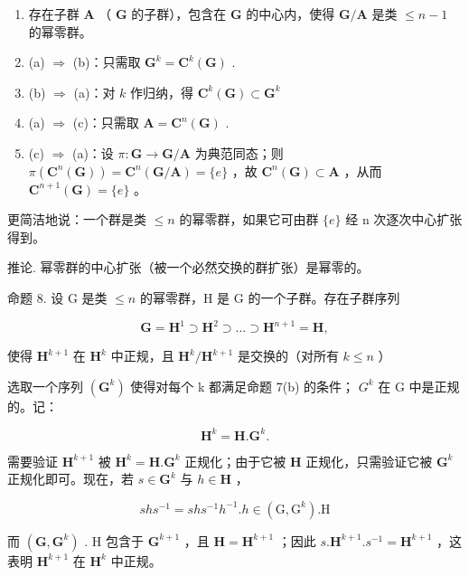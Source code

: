 \begin{enumerate}
\def\labelenumi{(\alph{enumi})}
\setcounter{enumi}{2}
\item
  存在子群 \(\mathbf{A}\) （ \(\mathbf{G}\) 的子群），包含在 \(\mathbf{G}\) 的中心内，使得 \(\mathbf{G} / \mathbf{A}\) 是类 \(\leqslant n - 1\) 的幂零群。
\item
  (a) \(\Rightarrow\) (b)：只需取 \(\mathbf{G}^k = \mathbf{C}^k (\mathbf{G})\) .
\item
  (b) \(\Rightarrow\) (a)：对 \(k\) 作归纳，得 \(\mathbf{C}^k (\mathbf{G})\subset \mathbf{G}^k\)
\item
  (a) \(\Rightarrow\) (c)：只需取 \(\mathbf{A} = \mathbf{C}^n (\mathbf{G})\) .
\item
  (c) \(\Rightarrow\) (a)：设 \(\pi: \mathbf{G} \to \mathbf{G} / \mathbf{A}\) 为典范同态；则 \(\pi(\mathbf{C}^n(\mathbf{G})) = \mathbf{C}^n(\mathbf{G} / \mathbf{A}) = \{e\}\) ，故 \(\mathbf{C}^n(\mathbf{G}) \subset \mathbf{A}\) ，从而 \(\mathbf{C}^{n+1}(\mathbf{G}) = \{e\}\) 。
\end{enumerate}

更简洁地说：一个群是类 \(\leqslant n\) 的幂零群，如果它可由群 \(\{e\}\) 经 n 次逐次中心扩张得到。

推论. 幂零群的中心扩张（被一个必然交换的群扩张）是幂零的。

命题 8. 设 G 是类 \(\leqslant n\) 的幂零群，H 是 G 的一个子群。存在子群序列

\[
\mathbf {G} = \mathbf {H} ^ {1} \supset \mathbf {H} ^ {2} \supset \dots \supset \mathbf {H} ^ {n + 1} = \mathbf {H},
\]

使得 \(\mathbf{H}^{k + 1}\) 在 \(\mathbf{H}^k\) 中正规，且 \(\mathbf{H}^k /\mathbf{H}^{k + 1}\) 是交换的（对所有 \(k\leqslant n\) ）

选取一个序列 \((\mathbf{G}^{k})\) 使得对每个 k 都满足命题 7(b) 的条件； \(G^{k}\) 在 G 中是正规的。记：

\[
\mathbf {H} ^ {k} = \mathbf {H}. \mathbf {G} ^ {k}.
\]

需要验证 \(\mathbf{H}^{k + 1}\) 被 \(\mathbf{H}^k = \mathbf{H}.\mathbf{G}^k\) 正规化；由于它被 \(\mathbf{H}\) 正规化，只需验证它被 \(\mathbf{G}^k\) 正规化即可。现在，若 \(s\in \mathbf{G}^k\) 与 \(h\in \mathbf{H}\) ，

\[
s h s ^ {- 1} = s h s ^ {- 1} h ^ {- 1}. h \in (\mathrm{G}, \mathrm{G} ^ {k}). \mathrm{H}
\]

而 \((\mathbf{G},\mathbf{G}^k)\) . H 包含于 \(\mathbf{G}^{k + 1}\) ，且 \(\mathbf{H} = \mathbf{H}^{k + 1}\) ；因此 \(s.\mathbf{H}^{k + 1}.s^{-1} = \mathbf{H}^{k + 1}\) ，这表明 \(\mathbf{H}^{k + 1}\) 在 \(\mathbf{H}^k\) 中正规。


